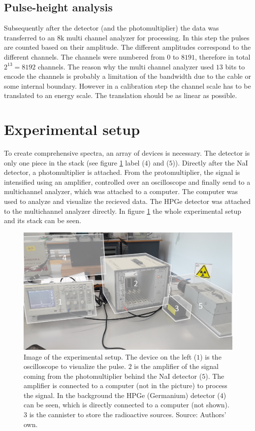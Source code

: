 \documentclass[a4paper]{article}
\begin{document}
\subsection{Pulse-height analysis}

Subsequently after the detector (and the photomultiplier) the data was transferred to an 8k multi channel analyzer for processing. In this step the pulses are counted based on their amplitude. The different amplitudes correspond to the different channels. The channels were numbered from $0$ to $8191$, therefore in total $2^{13} = 8192$ channels. The reason why the multi channel analyzer used $13$ bits to encode the channels is probably a limitation of the bandwidth due to the cable or some internal boundary. However in a calibration step the channel scale has to be translated to an energy scale. The translation should be as linear as possible.

\section{Experimental setup}

To create comprehensive spectra, an array of devices is necessary. The detector is only one piece in the stack (see figure \ref{fig:setup} label ($4$) and ($5$)). Directly after the NaI detector, a photomultiplier is attached. From the protomultiplier, the signal is intensified using an amplifier, controlled over an oscilloscope and finally send to a multichannel analyzer, which was attached to a computer. The computer was used to analyze and visualize the recieved data. The HPGe detector was attached to the multichannel analyzer directly. In figure \ref{fig:setup} the whole experimental setup and its stack can be seen.

\begin{figure}[H]
\captionsetup{singlelinecheck=off}
\centering
\includegraphics[width=1.0\textwidth]{img/setup.jpg}
\caption[blubb]{Image of the experimental setup. The device on the left ($1$) is the oscilloscope to visualize the pulse. $2$ is the amplifier of the signal coming from the photomultiplier behind the NaI detector ($5$). The amplifier is connected to a computer (not in the picture) to process the signal. In the background the HPGe (Germanium) detector ($4$) can be seen, which is directly connected to a computer (not shown). $3$ is the cannister to store the radioactive sources. Source: Authors' own.}
\label{fig:setup}
\end{figure}
\end{document}
